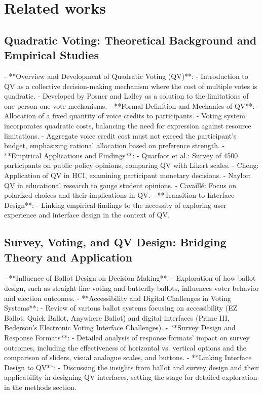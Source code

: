 \section{Related works}

\subsection{Quadratic Voting: Theoretical Background and Empirical Studies}
- **Overview and Development of Quadratic Voting (QV)**: 
  - Introduction to QV as a collective decision-making mechanism where the cost of multiple votes is quadratic.
  - Developed by Posner and Lalley as a solution to the limitations of one-person-one-vote mechanisms.
- **Formal Definition and Mechanics of QV**: 
  - Allocation of a fixed quantity of voice credits to participants.
  - Voting system incorporates quadratic costs, balancing the need for expression against resource limitations.
  - Aggregate voice credit cost must not exceed the participant's budget, emphasizing rational allocation based on preference strength.
- **Empirical Applications and Findings**: 
  - Quarfoot et al.: Survey of 4500 participants on public policy opinions, comparing QV with Likert scales.
  - Cheng: Application of QV in HCI, examining participant monetary decisions.
  - Naylor: QV in educational research to gauge student opinions.
  - Cavaillé: Focus on polarized choices and their implications in QV.
- **Transition to Interface Design**: 
  - Linking empirical findings to the necessity of exploring user experience and interface design in the context of QV.

\subsection{Survey, Voting, and QV Design: Bridging Theory and Application}
- **Influence of Ballot Design on Decision Making**: 
  - Exploration of how ballot design, such as straight line voting and butterfly ballots, influences voter behavior and election outcomes.
- **Accessibility and Digital Challenges in Voting Systems**: 
  - Review of various ballot systems focusing on accessibility (EZ Ballot, Quick Ballot, Anywhere Ballot) and digital interfaces (Prime III, Bederson's Electronic Voting Interface Challenges).
- **Survey Design and Response Formats**: 
  - Detailed analysis of response formats' impact on survey outcomes, including the effectiveness of horizontal vs. vertical options and the comparison of sliders, visual analogue scales, and buttons.
- **Linking Interface Design to QV**: 
  - Discussing the insights from ballot and survey design and their applicability in designing QV interfaces, setting the stage for detailed exploration in the methods section.

